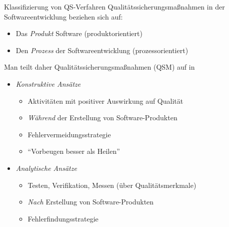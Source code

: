 \begin{defi}{Klassifizierung von QS-Verfahren}
    Qualitätssicherungsmaßnahmen in der Softwareentwicklung beziehen sich auf:
    \begin{itemize}
        \item Das \emph{Produkt} Software (produktorientiert)
        \item Den \emph{Prozess} der Softwareentwicklung (prozessorientiert)
    \end{itemize}

    Man teilt daher Qualitätssicherungsmaßnahmen (QSM) auf in
    \begin{itemize}
        \item \emph{Konstruktive Ansätze}
              \begin{itemize}
                  \item Aktivitäten mit positiver Auswirkung auf Qualität
                  \item \emph{Während} der Erstellung von Software-Produkten
                  \item Fehlervermeidungsstrategie
                  \item \enquote{Vorbeugen besser als Heilen}
              \end{itemize}
        \item \emph{Analytische Ansätze}
              \begin{itemize}
                  \item Testen, Verifikation, Messen (über Qualitätsmerkmale)
                  \item \emph{Nach} Erstellung von Software-Produkten
                  \item Fehlerfindungsstrategie
              \end{itemize}
    \end{itemize}
\end{defi}

